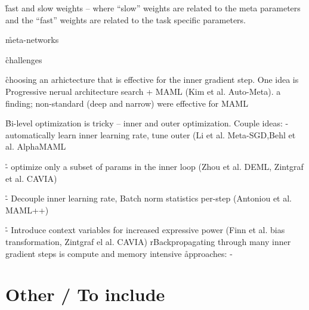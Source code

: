 \r{fast and slow weights -- where ``slow'' weights are related to the meta parameters and the ``fast'' weights are related to the task specific parameters.}

\r{meta-networks \cite{munkhdalai2017meta}}









\r{challenges}

\r{choosing an arhictecture that is effective for the inner gradient step. One idea is Progressive nerual architecture search + MAML (Kim et al. Auto-Meta). a finding; non-standard (deep and narrow) were effective for MAML}

\r{Bi-level optimization is tricky -- inner and outer optimization. Couple ideas: - automatically learn inner learning rate, tune outer (Li et al. Meta-SGD,Behl et al. AlphaMAML} 

\r{- optimize only a subset of params in the inner loop (Zhou et al. DEML, Zintgraf et al. CAVIA)}

\r{- Decouple inner learning rate, Batch norm statistics per-step (Antoniou et al. MAML++)}
 
\r{- Introduce context variables for increased expressive power (Finn et al. bias transformation, Zintgraf el al. CAVIA)}
r{Backpropagating through many inner gradient steps is compute and memory intensive}
\r{approaches: - }



\section{Other / To include}

